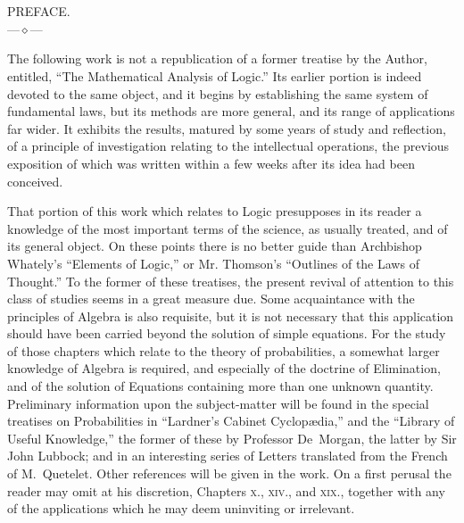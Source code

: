 \documentclass[oneside]{book}
\begin{document}
\chapter[PREFACE.]{}
\begin{center}\Huge PREFACE.\\
\bigskip
\normalsize
---$\diamond$---\\
\end{center}
\bigskip
The following work is not a republication of a former treatise
by the Author, entitled, ``The Mathematical Analysis
of Logic.'' Its earlier portion is indeed devoted to the same
object, and it begins by establishing the same system of fundamental
laws, but its methods are more general, and its range of
applications far wider. It exhibits the results, matured by some
years of study and reflection, of a principle of investigation relating
to the intellectual operations, the previous exposition of
which was written within a few weeks after its idea had been
conceived.

That portion of this work which relates to Logic presupposes
in its reader a knowledge of the most important terms of the
science, as usually treated, and of its general object. On these
points there is no better guide than Archbishop Whately's
``Elements of Logic,'' or Mr. Thomson's ``Outlines of the Laws
of Thought.'' To the former of these treatises, the present revival
of attention to this class of studies seems in a great measure
due. Some acquaintance with the principles of Algebra is also
requisite, but it is not necessary that this application should have
been carried beyond the solution of simple equations. For the
study of those chapters which relate to the theory of probabilities,
a somewhat larger knowledge of Algebra is required, and especially
of the doctrine of Elimination, and of the solution of Equations
containing more than one unknown quantity. Preliminary
information upon the subject-matter will be found in the special
treatises on Probabilities in ``Lardner's Cabinet Cyclop{\ae}dia,''
and the ``Library of Useful Knowledge,'' the former of these by
Professor De~Morgan, the latter by Sir John Lubbock; and in
an interesting series of Letters translated from the French of
M.~Quetelet. Other references will be given in the work. On a
first perusal the reader may omit at his discretion, Chapters \textsc{x}.,
\textsc{xiv}., and \textsc{xix}., together with any of the applications which he
may deem uninviting or irrelevant.
\end{document}
